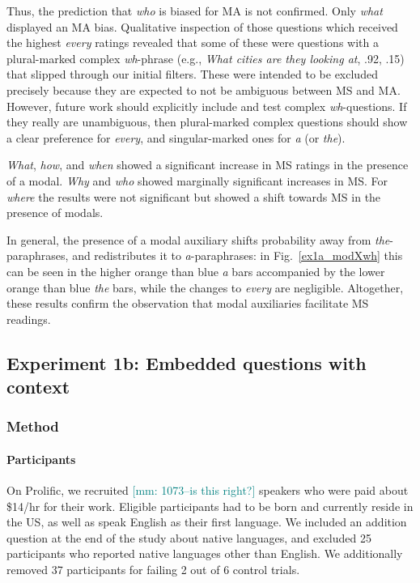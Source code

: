 \documentclass[12pt,letterpaper,table,svgnames,dvipsnames]{article}
\newcommand{\mm}[1]{\textcolor{teal}{[mm: #1]}}
\newcommand{\figref}[1]{Fig.~\ref{#1}}
\begin{document}
Thus, the prediction that \emph{who} is biased for MA is not confirmed. Only \emph{what} displayed an MA bias. Qualitative inspection of those questions which received the highest \emph{every} ratings revealed that some of these were questions with a plural-marked complex \emph{wh}-phrase (e.g., \emph{What cities are they looking at}, .92, .15) that slipped through our initial filters. These were intended to be excluded precisely because they are expected to not be ambiguous between MS and MA. However, future work should explicitly include and test complex \emph{wh}-questions. If they really are unambiguous, then plural-marked complex questions should show a clear preference for \emph{every}, and singular-marked ones for \emph{a} (or \emph{the}).

\emph{What}, \emph{how}, and \emph{when} showed a significant increase in MS ratings in the presence of a modal. \emph{Why} and \emph{who} showed marginally significant increases in MS. For \emph{where} the results were not significant but showed a shift towards MS in the presence of modals.

In general, the presence of a modal auxiliary shifts probability away from \emph{the}-paraphrases, and redistributes it to \emph{a}-paraphrases: in \figref{ex1a_modXwh} this can be seen in the higher orange than blue \emph{a} bars accompanied by the lower orange than blue \emph{the} bars, while the changes to \emph{every} are negligible. Altogether, these results confirm the observation that modal auxiliaries facilitate MS readings. 

\subsection{Experiment 1b: Embedded questions with context}

\subsubsection{Method}

\paragraph{Participants}
On Prolific, we recruited \mm{1073--is this right?} speakers who were paid about \$14/hr for their work. Eligible participants had to be born and currently reside in the US, as well as speak English as their first language. We included an addition question at the end of the study about native languages, and excluded 25 participants who reported native languages other than English. We additionally removed 37 participants for failing 2 out of 6 control trials.
\end{document}
